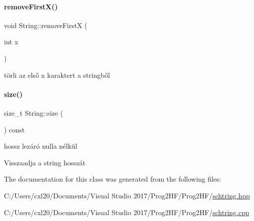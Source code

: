 \mbox{\label{class_string_a15c07ede44c5bcfb0920e9bf63e75670}} 
\paragraph{\texorpdfstring{removeFirstX()}{removeFirstX()}}
{\footnotesize\ttfamily void String\+::remove\+FirstX (\begin{DoxyParamCaption}\item[{int}]{x }\end{DoxyParamCaption})}



törli az első x karaktert a stringből 

\mbox{\label{class_string_a588c5cc9faededbb9d938662d354feed}} 
\paragraph{\texorpdfstring{size()}{size()}}
{\footnotesize\ttfamily size\+\_\+t String\+::size (\begin{DoxyParamCaption}{ }\end{DoxyParamCaption}) const\hspace{0.3cm}{\ttfamily [inline]}}



hossz lezáró nulla nélkül 

Visszaadja a string hosszát 

The documentation for this class was generated from the following files\+:\begin{DoxyCompactItemize}
\item 
C\+:/\+Users/cxl20/\+Documents/\+Visual Studio 2017/\+Prog2\+H\+F/\+Prog2\+H\+F/\mbox{\hyperlink{schtring_8hpp}{schtring.\+hpp}}\item 
C\+:/\+Users/cxl20/\+Documents/\+Visual Studio 2017/\+Prog2\+H\+F/\+Prog2\+H\+F/\mbox{\hyperlink{schtring_8cpp}{schtring.\+cpp}}\end{DoxyCompactItemize}
